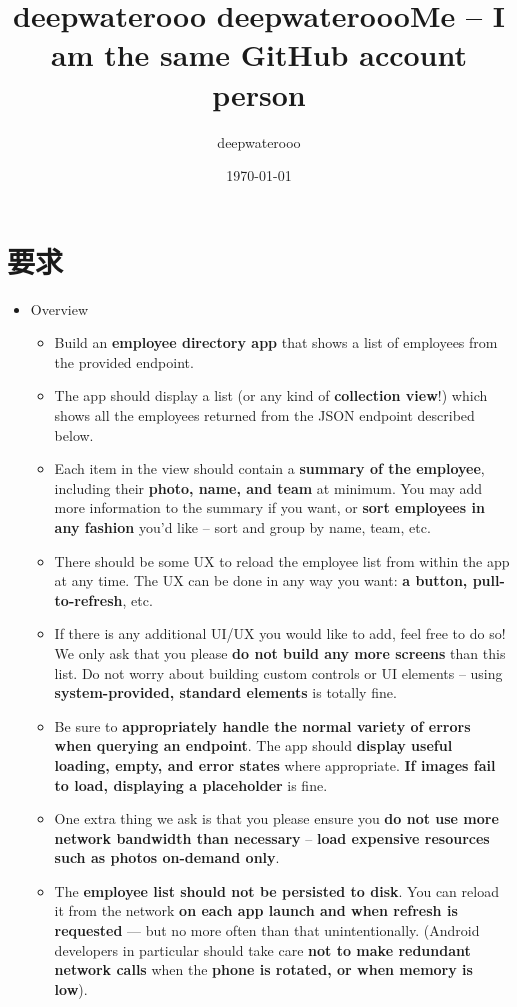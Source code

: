 \documentclass[9pt, b5paper]{article}
\author{deepwaterooo}
\date{\today}
\title{deepwaterooo deepwateroooMe -- I am the same GitHub account person}
\begin{document}
\maketitle
\tableofcontents


\section{要求}
\label{sec-1}
\begin{itemize}
\item Overview
\begin{itemize}
\item Build an \textbf{employee directory app} that shows a list of employees from the provided endpoint.
\item The app should display a list (or any kind of \textbf{collection view}!) which shows all the employees returned from the JSON endpoint described below.
\item Each item in the view should contain a \textbf{summary of the employee}, including their \textbf{photo, name, and team} at minimum. You may add more information to the summary if you want, or \textbf{sort employees in any fashion} you’d like – sort and group by name, team, etc.
\item There should be some UX to reload the employee list from within the app at any time. The UX can be done in any way you want: \textbf{a button, pull-to-refresh}, etc.
\item If there is any additional UI/UX you would like to add, feel free to do so! We only ask that you please \textbf{do not build any more screens} than this list. Do not worry about building custom controls or UI elements – using \textbf{system-provided, standard elements} is totally fine.
\item Be sure to \textbf{appropriately handle the normal variety of errors when querying an endpoint}. The app should \textbf{display useful loading, empty, and error states} where appropriate. \textbf{If images fail to load, displaying a placeholder} is fine.
\item One extra thing we ask is that you please ensure you \textbf{do not use more network bandwidth than necessary} – \textbf{load expensive resources such as photos on-demand only}.
\item The \textbf{employee list should not be persisted to disk}. You can reload it from the network \textbf{on each app launch and when refresh is requested} — but no more often than that unintentionally. (Android developers in particular should take care \textbf{not to make redundant network calls} when the \textbf{phone is rotated, or when memory is low}).

\end{itemize}
\end{itemize}
\end{document}

